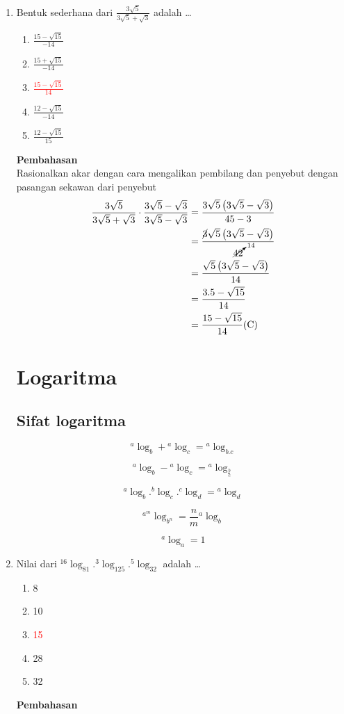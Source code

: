 \documentclass{report}
\newcommand{\options}[5]{
\begin{enumerate}[label=\alph*.]
	\item #1
	\item #2
	\item #3
	\item #4
	\item #5
\end{enumerate}
}
\newcommand{\pemb}{ \textbf{Pembahasan} \\}
\begin{document}
\begin{enumerate}
\item
Bentuk sederhana dari $\frac{3\sqrt{5}}{3\sqrt{5}+\sqrt{3}}$ adalah \ldots
\options
{$\frac{15-\sqrt{15}}{-14}$}
{$\frac{15+\sqrt{15}}{-14}$}
{\textcolor{red}{$\frac{15-\sqrt{15}}{14}$}}
{$\frac{12-\sqrt{15}}{-14}$}
{$\frac{12-\sqrt{15}}{15}$}
\pemb
Rasionalkan akar dengan cara mengalikan pembilang dan penyebut dengan pasangan sekawan dari penyebut
\begin{align*}
	\frac{3\sqrt{5}}{3\sqrt{5}+\sqrt{3}} \cdot \frac{3\sqrt{5}-\sqrt{3}}{3\sqrt{5}-\sqrt{3}}
	&= \frac{3\sqrt{5}\left(3\sqrt{5}-\sqrt{3}\right)}{45-3} \\
	&= \frac{\cancel{3}\sqrt{5}\left(3\sqrt{5}-\sqrt{3}\right)}{\cancelto{14}{42}} \\
	&= \frac{\sqrt{5}\left(3\sqrt{5}-\sqrt{3}\right)}{14} \\
	&= \frac{3.5-\sqrt{15}}{14} \\
	&= \frac{15-\sqrt{15}}{14} \text{(C)}
\end{align*}

\chapter{Logaritma}
\section*{Sifat logaritma}

\begin{equation}
\label{log_add}
{}^a\log_{b} + {}^a\log_{c} = {}^{a}\log_{b.c}
\end{equation}

\begin{equation}
\label{log_sub}
{}^a\log_{b} - {}^a\log_{c} = {}^{a}\log_{\frac{b}{c}}
\end{equation}

\begin{equation}
\label{log_chain}
{}^a\log_{b} . {}^b\log_{c} . {}^c\log_{d} = {}^a\log_{d}
\end{equation}

\begin{equation}
\label{log_ext}
{}^{{a}^{m}}\log_{b^{n}} = \frac{n}{m}{}^a\log_{ b}
\end{equation}

\begin{equation}
\label{log_one}
{}^{a}\log_{a} = 1
\end{equation}

\item
Nilai dari ${}^{16}\log_{81}.{}^{3}\log_{125}.{}^{5}\log_{32}$ adalah \ldots
\options
{8}
{10}
{\textcolor{red}{15}}
{28}
{32}
\pemb


\end{enumerate}
\end{document}

